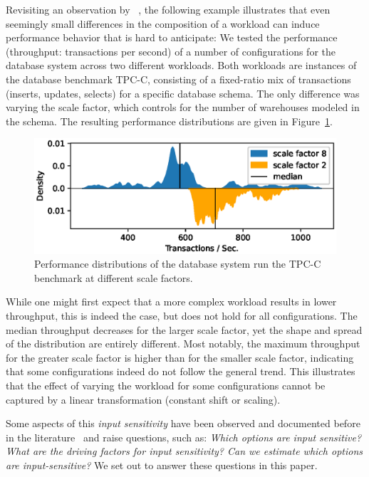 Revisiting an observation by \citeauthor{alves_sampling_2020}~\cite{alves_sampling_2020}, the following example illustrates that even seemingly small differences in the composition of a workload can induce performance behavior that is hard to anticipate: We tested the performance (throughput: transactions per second) of a number of configurations for the database system \htwo across two different workloads. Both workloads are instances of the database benchmark \textsf{TPC-C}, consisting of a fixed-ratio mix of transactions (inserts, updates, selects) for a specific database schema. The only difference was varying the scale factor, which controls for the number of warehouses modeled in the schema. The resulting performance distributions are given in Figure~\ref{fig:h2_intro}.
\begin{figure}
	\centering
	\includegraphics[width=0.85\linewidth]{images/h2_motivation.eps}
	\caption{Performance distributions of the database system \htwo run the \textsf{TPC-C} benchmark at different scale factors.}
	\label{fig:h2_intro}
\end{figure}
While one might first expect that a more complex workload results in lower throughput, this is indeed the case, but does not hold for all configurations. The median throughput decreases for the larger scale factor, yet the shape and spread of the distribution are entirely different. Most notably, the maximum throughput for the greater scale factor is higher than for the smaller scale factor, indicating that some configurations indeed do not follow the general trend. This illustrates that the effect of varying the workload for some configurations cannot be captured by a linear transformation (constant shift or scaling).


Some aspects of this \emph{input sensitivity} have been observed and documented before in the literature~\cite{liao_2020_using_emse,alves_sampling_2020,jamishidi_transfer_2017} and raise questions, such as: \textit{Which options are input sensitive? What are the driving factors for input sensitivity? Can we estimate which options are input-sensitive?} We set out to answer these questions in this paper.
	
